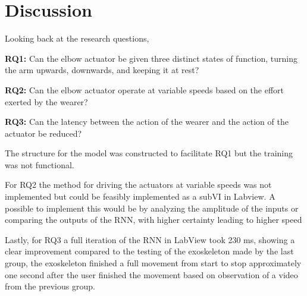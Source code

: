 \section{Discussion}
\label{section:disc}

Looking back at the research questions,

\textbf{RQ1:} Can the elbow actuator be given three distinct states of function, turning the arm upwards, downwards, and keeping it at rest?

\textbf{RQ2:} Can the elbow actuator operate at variable speeds based on the effort exerted by the wearer?

\textbf{RQ3:} Can the latency between the action of the wearer and the action of the actuator be reduced?

The structure for the model was constructed to facilitate RQ1 but the training was not functional.

For RQ2 the method for driving the actuators at variable speeds was not implemented but could be feasibly implemented as a subVI in Labview. 
A possible to implement this would be by analyzing the amplitude of the inputs or comparing the outputs of the RNN, with higher certainty leading to higher speed 

Lastly, for RQ3 a full iteration of the RNN in LabView took 230 ms, showing a clear improvement compared to the testing of the exoskeleton 
made by the last group, the exoskeleton finished a full movement from start to stop approximately one second after the user finished the 
movement based on observation of a video from the previous group.
